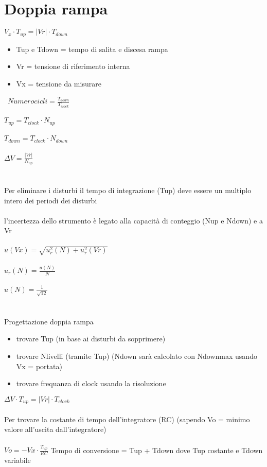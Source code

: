 \documentclass{article}
\begin{document}
	
		
	 	\section{Doppia rampa}
	 	\(V_x \cdot T_{up} = |Vr| \cdot T_{down}\)
	 	\begin{itemize}
	 		\item Tup e Tdown = tempo di salita e discesa rampa
	 		\item Vr = tensione di riferimento interna
	 		\item Vx = tensione da misurare
	 	\end{itemize}
 		\
 		\(Numero cicli = \frac{T_{down}}{T_{clock}}\)\\\\
 		\(T_{up} = T_{clock} \cdot N_{up} \)\\\\
 		\(T_{down} = T_{clock} \cdot N_{down} \)\\\\
 		\(\Delta V = \frac{|Vr|}{N_{up}}\)\\\\\\
 		Per eliminare i disturbi il tempo di integrazione (Tup) deve essere un multiplo intero dei periodi dei disturbi\\\\
 		
 		l'incertezza dello strumento è legato alla capacità di conteggio (Nup e Ndown) e a Vr\\\\
 		\(u(Vx) = \sqrt{u_r^2(N)+u_r^2(Vr)}\)\\\\
 		\(u_r(N) = \frac{u(N)}{N}\)\\\\
 		\(u(N) = \frac{1}{\sqrt{12}}\)\\\\\\
 		
 		{\large Progettazione doppia rampa}
 		
 		\begin{itemize}
 			\item trovare Tup (in base ai disturbi da sopprimere)
 			\item trovare Nlivelli (tramite Tup) (Ndown sarà calcolato con Ndownmax usando Vx = portata)
 			\item trovare frequanza di clock usando la risoluzione
 		\end{itemize}
 		\(\Delta V \cdot T_{up} = |Vr| \cdot T_{clock}\)\\\\
 		Per trovare la costante di tempo dell'integratore (RC) (sapendo Vo = minimo valore all'uscita dall'integratore)\\\\
 		\(Vo = -Vx \cdot \frac{T_{up}}{RC}\)
 		Tempo di conversione = Tup + Tdown dove Tup costante e Tdown variabile\\\\\\
 		
\end{document}
